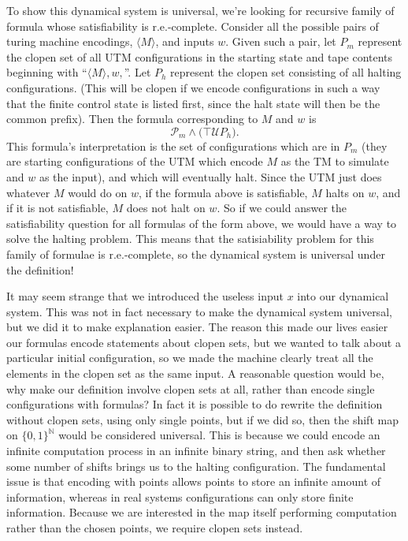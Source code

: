 \documentclass{fkpaper}
\newcommand{\ltil}{\mathcal{U}}
\newcommand{\psc}{\mathcal{P}}
\renewcommand{\Nn}{\mathbb{N}}
\begin{document}
\begin{multicols}{2}
To show this dynamical system is universal, we're looking for recursive family of formula whose satisfiability is r.e.-complete. Consider all the possible pairs of turing machine encodings, $\langle M \rangle$, and inputs $w$. Given such a pair, let $P_m$ represent the clopen set of all UTM configurations in the starting state and tape contents beginning with ``$\langle M \rangle , w,$''. Let $P_{h}$ represent the clopen set consisting of all halting configurations. (This will be clopen if we encode configurations in such a way that the finite control state is listed first, since the halt state will then be the common prefix). Then the formula corresponding to $M$ and $w$ is $$ \psc_{m} \land \Big( \top \ltil P_{h} \Big).$$ This formula's interpretation is the set of configurations which are in $P_m$ (they are starting configurations of the UTM which encode $M$ as the TM to simulate and $w$ as the input), and which will eventually halt. Since the UTM just does whatever $M$ would do on $w$, if the formula above is satisfiable, $M$ halts on $w$, and if it is not satisfiable, $M$ does not halt on $w$. So if we could answer the satisfiability question for all formulas of the form above, we would have a way to solve the halting problem. This means that the satisiability problem for this family of formulae is r.e.-complete, so the dynamical system is universal under the definition!

It may seem strange that we introduced the useless input $x$ into our dynamical system. This was not in fact necessary to make the dynamical system universal, but we did it to make explanation easier. The reason this made our lives easier our formulas encode statements about clopen sets, but we wanted to talk about a particular initial configuration, so we made the machine clearly treat all the elements in the clopen set as the same input. A reasonable question would be, why make our definition involve clopen sets at all, rather than encode single configurations with formulas? In fact it is possible to do rewrite the definition without clopen sets, using only single points, but if we did so, then the shift map on $\{0,1\}^\Nn$ would be considered universal. This is because we could encode an infinite computation process in an infinite binary string, and then ask whether some number of shifts brings us to the halting configuration. The fundamental issue is that encoding with points allows points to store an infinite amount of information, whereas in real systems configurations can only store finite information. Because we are interested in the map itself performing computation rather than the chosen points, we require clopen sets instead.


\end{multicols}
\end{document}
